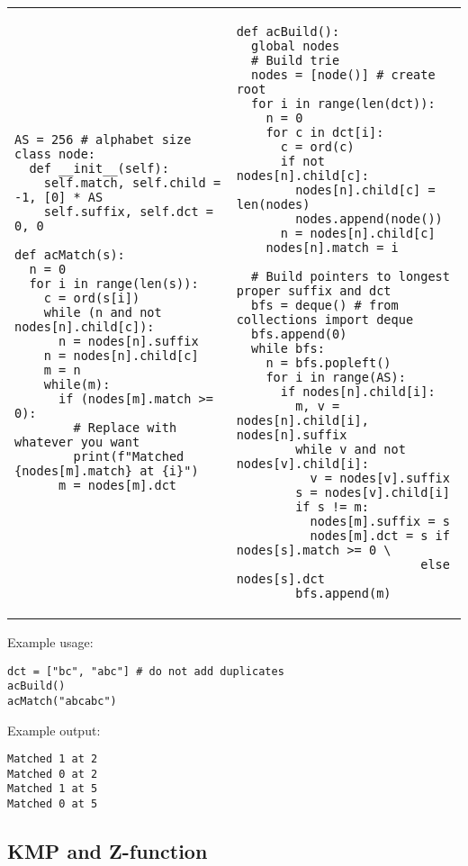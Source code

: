 \documentclass[letterpaper]{article}
\begin{document}
\begin{tabular}{@{}p{9cm}p{9cm}@{}}
    \begin{lstlisting}
AS = 256 # alphabet size
class node:
  def __init__(self):
    self.match, self.child = -1, [0] * AS
    self.suffix, self.dct = 0, 0

def acMatch(s):
  n = 0
  for i in range(len(s)):
    c = ord(s[i])
    while (n and not nodes[n].child[c]):
      n = nodes[n].suffix
    n = nodes[n].child[c]
    m = n
    while(m):
      if (nodes[m].match >= 0):
        # Replace with whatever you want
        print(f"Matched {nodes[m].match} at {i}")
      m = nodes[m].dct
\end{lstlisting}
     &
    \begin{lstlisting}
def acBuild():
  global nodes
  # Build trie
  nodes = [node()] # create root
  for i in range(len(dct)):
    n = 0
    for c in dct[i]:
      c = ord(c)
      if not nodes[n].child[c]:
        nodes[n].child[c] = len(nodes)
        nodes.append(node())
      n = nodes[n].child[c]
    nodes[n].match = i

  # Build pointers to longest proper suffix and dct
  bfs = deque() # from collections import deque
  bfs.append(0)
  while bfs:
    n = bfs.popleft()
    for i in range(AS):
      if nodes[n].child[i]:
        m, v = nodes[n].child[i], nodes[n].suffix
        while v and not nodes[v].child[i]:
          v = nodes[v].suffix
        s = nodes[v].child[i]
        if s != m:
          nodes[m].suffix = s
          nodes[m].dct = s if nodes[s].match >= 0 \
                         else nodes[s].dct
        bfs.append(m)
\end{lstlisting}
\end{tabular}

Example usage:

\begin{lstlisting}
dct = ["bc", "abc"] # do not add duplicates
acBuild()
acMatch("abcabc")
\end{lstlisting}

Example output:

\begin{lstlisting}
Matched 1 at 2
Matched 0 at 2
Matched 1 at 5
Matched 0 at 5
\end{lstlisting}


\clearpage

\subsection{KMP and Z-function}
\end{document}
